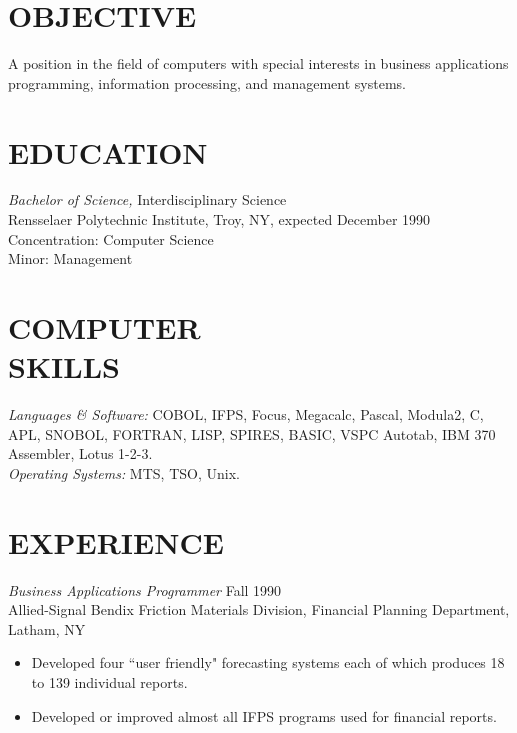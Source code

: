 \documentclass[margin]{res}
\begin{document}
\begin{resume}
 
\section{OBJECTIVE}  A position in the field of computers with special 
                interests in business applications programming, 
                information processing, and management systems. 
 

\section{EDUCATION} {\sl Bachelor of Science,} Interdisciplinary Science \\
                Rensselaer Polytechnic Institute, Troy, NY, 
                expected December 1990 \\
                Concentration: Computer Science \\
                Minor: Management 
 
 
\section{COMPUTER \\ SKILLS} {\sl Languages \& Software:} COBOL, IFPS, Focus, 
         Megacalc, Pascal, Modula2, C, APL, SNOBOL, 
                FORTRAN, LISP, SPIRES, BASIC, VSPC Autotab, 
                IBM 370 Assembler, Lotus 1-2-3. \\
                {\sl Operating Systems:} MTS, TSO, Unix. 
 
\section{EXPERIENCE} {\sl Business Applications Programmer} \hfill Fall 1990 \\
                Allied-Signal Bendix Friction Materials Division, 
                Financial Planning Department, Latham, NY 
                 \begin{itemize}  \itemsep -2pt %
                 \item Developed four ``user friendly" forecasting 
                    systems each of which produces 18 to 139 
                    individual reports. 
                \item   Developed or improved almost all IFPS 
                    programs used for financial reports. 
                \end{itemize}
 

\end{resume}
\end{document}
